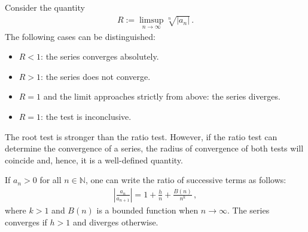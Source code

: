    \begin{method}
        Consider the quantity
        \begin{gather}
            R := \limsup_{n\rightarrow\infty}\sqrt[n]{|a_n|}\,.
        \end{gather}
        The following cases can be distinguished:
        \begin{itemize}
            \item $R<1$: the series converges absolutely.
            \item $R>1$: the series does not converge.
            \item $R=1$ and the limit approaches strictly from above: the series diverges.
            \item $R=1$: the test is inconclusive.
        \end{itemize}
    \end{method}
    \begin{remark}
        The root test is stronger than the ratio test. However, if the ratio test can determine the convergence of a series, the radius of convergence of both tests will coincide and, hence, it is a well-defined quantity.
    \end{remark}

    \begin{method}\label{series:gauss_test}
        If $a_n>0$ for all $n\in\mathbb{N}$, one can write the ratio of successive terms as follows:
        \begin{gather}
            \left|\frac{a_n}{a_{n+1}}\right| = 1 + \frac{h}{n} + \frac{B(n)}{n^k}\,,
        \end{gather}
        where $k>1$ and $B(n)$ is a bounded function when $n\longrightarrow\infty$. The series converges if $h>1$ and diverges otherwise.
    \end{method}


